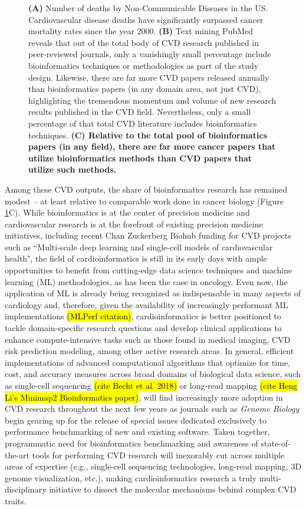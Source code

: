 \documentclass[letter]{bioinfo}
\begin{document}
\begin{figure}[!tpb]
	\caption{\textbf{(A)} Number of deaths by Non-Communicable Diseases in the US.  Cardiovascular disease deaths have significantly surpassed cancer mortality rates since the year 2000.  \textbf{(B)} Text mining PubMed reveals that out of the total body of CVD research published in peer-reviewed journals, only a vanishingly small percentage include bioinformatics techniques or methodologies as part of the study design.  Likewise, there are far more CVD papers released annually than bioinformatics papers (in any domain area, not just CVD), highlighting the tremendous momentum and volume of new research results published in the CVD field.  Nevertheless, only a small percentage of that total CVD literature includes bioinformatics techniques.  \textbf{(C) Relative to the total pool of bioinformatics papers (in any field), there are far more cancer papers that utilize bioinformatics methods than CVD papers that utilize such methods.}}
	\label{fig:figure1}
\end{figure}


Among these CVD outputs, the share of bioinformatics research has remained modest -- at least relative to comparable work done in cancer biology (Figure \ref{fig:figure1}C). While bioinformatics is at the center of precision medicine \citep{Gomez-Lopez:2017:Precision} and cardiovascular research is at the forefront of existing precision medicine initiatives, including recent Chan Zuckerberg Biohub funding for CVD projects such as ``Multi-scale deep learning and single-cell models of cardiovascular health", the field of cardioinformatics is still in its early days with ample opportunities to benefit from cutting-edge data science techniques and machine learning (ML) methodologies, as has been the case in oncology.  Even now, the application of ML is already being recognized as indispensable in many aspects of cardiology \citep{Shameer:2017:Translational,Shameer:2018:Machine} and, therefore, given the availability of increasingly performant ML implementations \hl{(MLPerf citation)}, cardioinformatics is better positioned to tackle domain-specific research questions and develop clinical applications to enhance compute-intensive tasks such as those found in medical imaging, CVD risk prediction modeling, among other active research areas. In general, efficient implementations of advanced computational algorithms that optimize for time, cost, and accuracy measures across broad domains of biological data science, such as single-cell sequencing \hl{(cite Becht et al. 2018)} or long-read mapping \hl{(cite Heng Li's Minimap2 Bioinformatics paper)}, will find increasingly more adoption in CVD research throughout the next few years as journals such as \emph{Genome Biology} begin gearing up for the release of special issues dedicated exclusively to performance benchmarking of new and existing software.  Taken together, programmatic need for bioinformatics benchmarking and awareness of state-of-the-art tools for performing CVD research will inexorably cut across multiple areas of expertise (e.g., single-cell sequencing technologies, long-read mapping, 3D genome visualization, etc.), making cardioinformatics research a truly multi-disciplinary initiative to dissect the molecular mechanisms behind complex CVD traits.   
\end{document}
